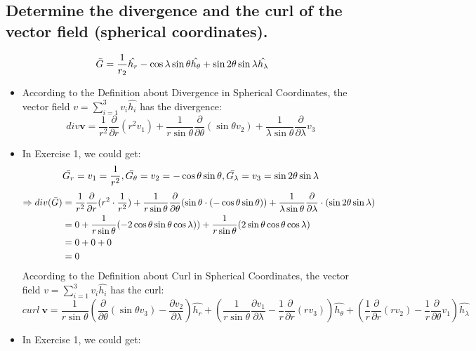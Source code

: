 \documentclass[12pt,a4paper]{article}
\begin{document}
\subsection{Determine the divergence and the curl of the vector field (spherical coordinates).}
\[\Bar{G} = \frac{1}{r_2}\hat{h_r}-\cos{\lambda}\sin{\theta}\hat{h_\theta}+\sin{2\theta\sin{\lambda\hat{h_\lambda}}}\]
\begin{itemize}
    \item According to the Definition about Divergence in Spherical Coordinates, the vector field $v = \sum_{i=1}^3 v_i\hat{h_i}$ has the divergence:\\
    \[div \textbf{v} = \frac{1}{r^2}\frac{\partial}{\partial r}(r^2v_1)+\frac{1}{r\sin{\theta}}\frac{\partial}{\partial\theta}(\sin{\theta}v_2)+\frac{1}{\lambda\sin\theta}\frac{\partial}{\partial\lambda}v_3\]
    \item In Exercise 1, we could get:\\
    \[\Bar{G_r} = v_1 = \frac{1}{r^2},\Bar{G_\theta} = v_2 = -\cos{\theta}\sin{\theta},\Bar{G_\lambda} = v_3 = \sin{2\theta}\sin{\lambda}\]
    \begin{equation}
    \begin{aligned}
        \Rightarrow div(\Bar{G}) &=  \frac{1}{r^2}\frac{\partial}{\partial r}(r^2\cdot\frac{1}{r^2})+\frac{1}{r\sin{\theta}}\frac{\partial}{\partial\theta}(\sin{\theta}\cdot(-\cos{\theta}\sin{\theta}))+\frac{1}{\lambda\sin\theta}\frac{\partial}{\partial\lambda}\cdot(\sin{2\theta}\sin{\lambda})\notag\\
        &= 0 + \frac{1}{r\sin{\theta}}(-2\cos{\theta}\sin{\theta}\cos{\lambda})) + \frac{1}{r\sin{\theta}}(2\sin{\theta}\cos{\theta}\cos{\lambda})\\
        &= 0 + 0 + 0\\
        &= 0
    \end{aligned}
    \end{equation}
    \irem According to the Definition about Curl in Spherical Coordinates, the vector field $v = \sum_{i=1}^3 v_i\hat{h_i}$ has the curl:\\
    \[curl\ \textbf{v} = \frac{1}{r\sin{\theta}}(\frac{\partial}{\partial\theta}(\sin{\theta}v_3) - \frac{\partial v_2}{\partial \lambda})\hat{h_r} + (\frac{1}{r\sin{\theta}}\frac{\partial v_1}{\partial\lambda}-\frac{1}{r}\frac{\partial}{\partial r}(rv_3))\hat{h_\theta}+(\frac{1}{r}\frac{\partial}{\partial r}(rv_2)-\frac{1}{r}\frac{\partial}{\partial\theta}v_1)\hat{h_\lambda}\]
    \item In Exercise 1, we could get:\\

\end{itemize}
\end{document}
